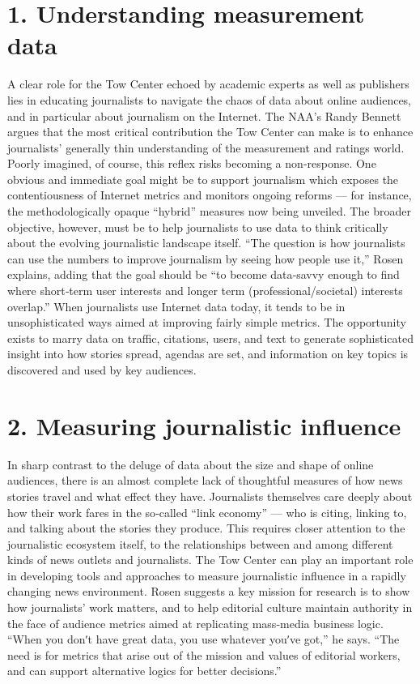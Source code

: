 \section{1. Understanding measurement data}
A clear role for the Tow Center echoed by academic experts as well as
publishers lies in educating journalists to navigate the chaos of data about
online audiences, and in particular about journalism on the Internet. The
NAA’s Randy Bennett argues that the most critical contribution the Tow
Center can make is to enhance journalists’ generally thin understanding of
the measurement and ratings world.
Poorly imagined, of course, this reflex risks becoming a non‐response.
One obvious and immediate goal might be to support journalism which
exposes the contentiousness of Internet metrics and monitors ongoing
reforms — for instance, the methodologically opaque ``hybrid'' measures
now being unveiled. The broader objective, however, must be to help
journalists to use data to think critically about the evolving journalistic
landscape itself.
``The question is how journalists can use the numbers to improve
journalism by seeing how people use it,'' Rosen explains, adding that the
goal should be ``to become data‐savvy enough to find where short‐term
user interests and longer term (professional/societal) interests overlap.''
When journalists use Internet data today, it tends to be in unsophisticated
ways aimed at improving fairly simple metrics. The opportunity exists to
marry data on traffic, citations, users, and text to generate sophisticated
insight into how stories spread, agendas are set, and information on key
topics is discovered and used by key audiences.
\section{2. Measuring journalistic influence}
In sharp contrast to the deluge of data about the size and shape of online
audiences, there is an almost complete lack of thoughtful measures of how
news stories travel and what effect they have. Journalists themselves care
deeply about how their work fares in the so‐called ``link economy'' — who
is citing, linking to, and talking about the stories they produce. This
requires closer attention to the journalistic ecosystem itself, to the
relationships between and among different kinds of news outlets and
journalists.
The Tow Center can play an important role in developing tools and
approaches to measure journalistic influence in a rapidly changing news
environment. Rosen suggests a key mission for research is to show how
journalists’ work matters, and to help editorial culture maintain authority
in the face of audience metrics aimed at replicating mass‐media business
logic. ``When you donʹt have great data, you use whatever youʹve got,'' he
says. ``The need is for metrics that arise out of the mission and values of
editorial workers, and can support alternative logics for better decisions.''
